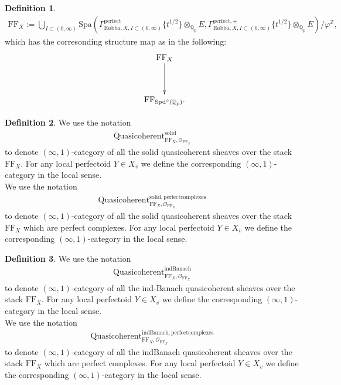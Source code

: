 \documentclass[12pt]{book}
\theoremstyle{definition}
\newtheorem{definition}{Definition}
\begin{document}
\begin{definition}
\begin{align}
\mathrm{FF}_X:=\bigcup_{I\subset (0,\infty)}\mathrm{Spa}(\Gamma^\text{perfect}_{\text{Robba},X,I\subset (0,\infty)}\{t^{1/2}\}\otimes_{\mathbb{Q}_p}E,\Gamma^{\text{perfect},+}_{\text{Robba},X,I\subset (0,\infty)}\{t^{1/2}\}\otimes_{\mathbb{Q}_p}E)/\varphi^\mathbb{Z},
\end{align}
which has the corresonding structure map as in the following:
\[\displayindent=-0.4in
\xymatrix@R+1pc{
&\mathrm{FF}_X  \ar[d] \\
&\mathrm{FF}_{\mathrm{Spd}^\diamond(\mathbb{Q}_p)}.  
}
\]
\end{definition}

\begin{definition}
We use the notation
\begin{align}
\mathrm{Quasicoherent}^{\mathrm{solid}}_{\mathrm{FF}_X,\mathcal{O}_{\mathrm{FF}_X}}
\end{align}
to denote $(\infty,1)$-category of all the solid quasicoherent sheaves over the stack $\mathrm{FF}_X$. For any local perfectoid $Y\in X_v$ we define the corresponding $(\infty,1)$-category in the local sense.\\
We use the notation
\begin{align}
\mathrm{Quasicoherent}^{\mathrm{solid,perfectcomplexes}}_{\mathrm{FF}_X,\mathcal{O}_{\mathrm{FF}_X}}
\end{align}
to denote $(\infty,1)$-category of all the solid quasicoherent sheaves over the stack $\mathrm{FF}_X$ which are perfect complexes. For any local perfectoid $Y\in X_v$ we define the corresponding $(\infty,1)$-category in the local sense.
\end{definition}


\begin{definition}
We use the notation
\begin{align}
\mathrm{Quasicoherent}^{\mathrm{indBanach}}_{\mathrm{FF}_X,\mathcal{O}_{\mathrm{FF}_X}}
\end{align}
to denote $(\infty,1)$-category of all the ind-Banach quasicoherent sheaves over the stack $\mathrm{FF}_X$. For any local perfectoid $Y\in X_v$ we define the corresponding $(\infty,1)$-category in the local sense.\\
We use the notation
\begin{align}
\mathrm{Quasicoherent}^{\mathrm{indBanach,perfectcomplexes}}_{\mathrm{FF}_X,\mathcal{O}_{\mathrm{FF}_X}}
\end{align}
to denote $(\infty,1)$-category of all the indBanach quasicoherent sheaves over the stack $\mathrm{FF}_X$ which are perfect complexes. For any local perfectoid $Y\in X_v$ we define the corresponding $(\infty,1)$-category in the local sense.
\end{definition}
\end{document}
